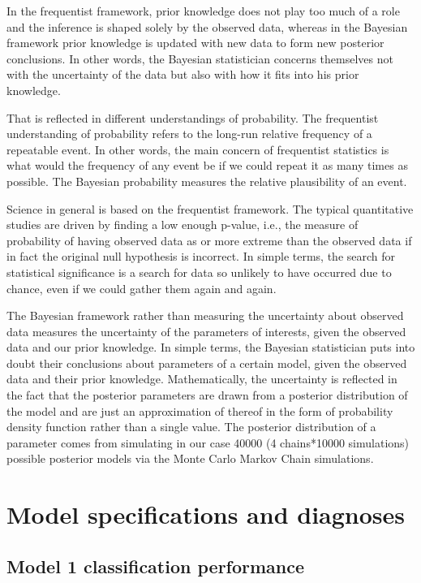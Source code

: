 \documentclass[
  11pt,
]{article}
\begin{document}
In the frequentist framework, prior knowledge does not play too much of
a role and the inference is shaped solely by the observed data, whereas
in the Bayesian framework prior knowledge is updated with new data to
form new posterior conclusions. In other words, the Bayesian
statistician concerns themselves not with the uncertainty of the data
but also with how it fits into his prior knowledge.

That is reflected in different understandings of probability. The
frequentist understanding of probability refers to the long-run relative
frequency of a repeatable event. In other words, the main concern of
frequentist statistics is what would the frequency of any event be if we
could repeat it as many times as possible. The Bayesian probability
measures the relative plausibility of an event.

Science in general is based on the frequentist framework. The typical
quantitative studies are driven by finding a low enough p-value, i.e.,
the measure of probability of having observed data as or more extreme
than the observed data if in fact the original null hypothesis is
incorrect. In simple terms, the search for statistical significance is a
search for data so unlikely to have occurred due to chance, even if we
could gather them again and again.

The Bayesian framework rather than measuring the uncertainty about
observed data measures the uncertainty of the parameters of interests,
given the observed data and our prior knowledge. In simple terms, the
Bayesian statistician puts into doubt their conclusions about parameters
of a certain model, given the observed data and their prior knowledge.
Mathematically, the uncertainty is reflected in the fact that the
posterior parameters are drawn from a posterior distribution of the
model and are just an approximation of thereof in the form of
probability density function rather than a single value. The posterior
distribution of a parameter comes from simulating in our case 40000 (4
chains*10000 simulations) possible posterior models via the Monte Carlo
Markov Chain simulations.

\hypertarget{model-specifications-and-diagnoses}{%
\section{Model specifications and
diagnoses}\label{model-specifications-and-diagnoses}}

\hypertarget{model-1-classification-performance}{%
\subsection{Model 1 classification
performance}\label{model-1-classification-performance}}
\end{document}
